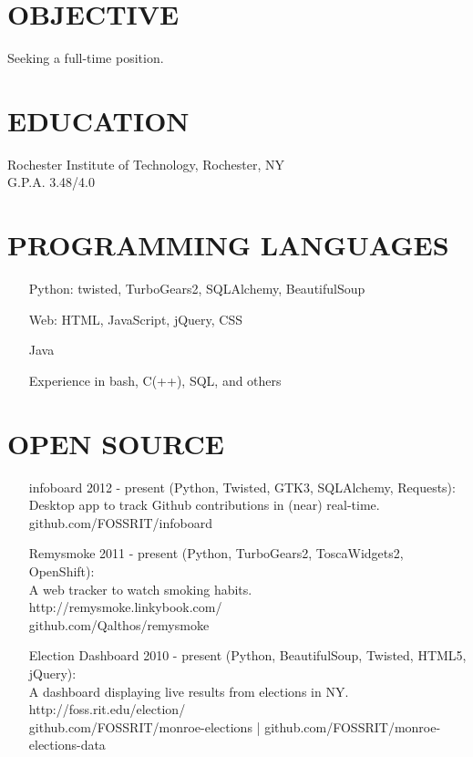 \documentclass[line]{res}
\begin{document}

\begin{resume}

\section{OBJECTIVE}
    Seeking a full-time position.

\section{EDUCATION}
    Rochester Institute of Technology, Rochester, NY \\
    G.P.A. 3.48/4.0

\section{PROGRAMMING LANGUAGES}
    \begin{itemize}
        \item[] Python: twisted, TurboGears2, SQLAlchemy, BeautifulSoup
        \item[] Web: HTML, JavaScript, jQuery, CSS
        \item[] Java
        \item[] Experience in bash, C(++), SQL, and others
    \end{itemize}

\section{OPEN SOURCE}
    \begin{itemize}
        \item[infoboard]
            2012 - present (Python, Twisted, GTK3, SQLAlchemy, Requests):\\
            Desktop app to track Github contributions in (near) real-time.\\
            github.com/FOSSRIT/infoboard

        \item[Remysmoke]
            2011 - present (Python, TurboGears2, ToscaWidgets2, OpenShift):\\
            A web tracker to watch smoking habits.\\
            http://remysmoke.linkybook.com/\\
            github.com/Qalthos/remysmoke

        \item[Election Dashboard]
            2010 - present (Python, BeautifulSoup, Twisted, HTML5, jQuery):\\
            A dashboard displaying live results from elections in NY.\\
            http://foss.rit.edu/election/\\
            github.com/FOSSRIT/monroe-elections | github.com/FOSSRIT/monroe-elections-data


\end{itemize}
\end{resume}
\end{document}
